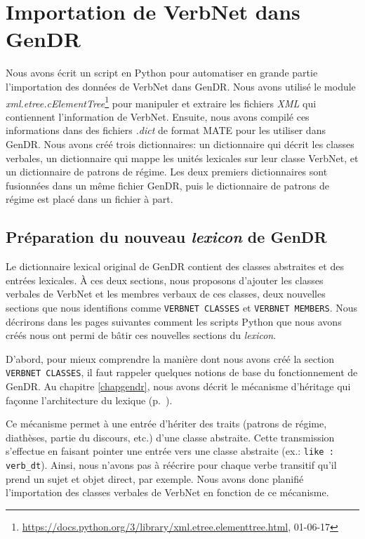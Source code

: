 
\chapter{Importation de VerbNet dans GenDR}\label{ch:python}

Nous avons écrit un script en Python pour automatiser en grande partie l'importation des données de VerbNet dans GenDR. Nous avons utilisé le module \emph{xml.etree.cElementTree}\footnote{\url{https://docs.python.org/3/library/xml.etree.elementtree.html}, 01-06-17} pour manipuler et extraire les fichiers \emph{XML} qui contiennent l'information de VerbNet. Ensuite, nous avons compilé ces informations dans des fichiers \emph{.dict} de format MATE pour les utiliser dans GenDR. Nous avons créé trois dictionnaires: un dictionnaire qui décrit les classes verbales, un dictionnaire qui mappe les unités lexicales sur leur classe VerbNet, et un dictionnaire de patrons de régime. Les deux premiers dictionnaires sont fusionnées dans un même fichier GenDR, puis le dictionnaire de patrons de régime est placé dans un fichier à part.
 
\section{Préparation du nouveau \emph{lexicon} de GenDR}

Le dictionnaire lexical original de GenDR contient des classes abstraites et des entrées lexicales. À ces deux sections, nous proposons d'ajouter les classes verbales de VerbNet et les membres verbaux de ces classes, deux nouvelles sections que nous identifions comme \texttt{VERBNET CLASSES} et \texttt{VERBNET MEMBERS}. Nous décrirons dans les pages suivantes comment les scripts Python que nous avons créés nous ont permi de bâtir ces nouvelles sections du \emph{lexicon}.

D'abord, pour mieux comprendre la manière dont nous avons créé la section \texttt{VERBNET CLASSES}, il faut rappeler quelques notions de base du fonctionnement de GenDR. Au chapitre \ref{chapgendr}, nous avons décrit le mécanisme d'héritage qui façonne l'architecture du lexique (p.~\pageref{sec:dictio}). 

Ce mécanisme permet à une entrée d'hériter des traits (patrons de régime, diathèses, partie du discours, etc.) d'une classe abstraite. Cette transmission s'effectue en faisant pointer une entrée vers une classe abstraite (ex.: \texttt{like : verb\_dt}). Ainsi, nous n'avons pas à réécrire pour chaque verbe transitif qu'il prend un sujet et objet direct, par exemple. Nous avons donc planifié l'importation des classes verbales de VerbNet en fonction de ce mécanisme.  

